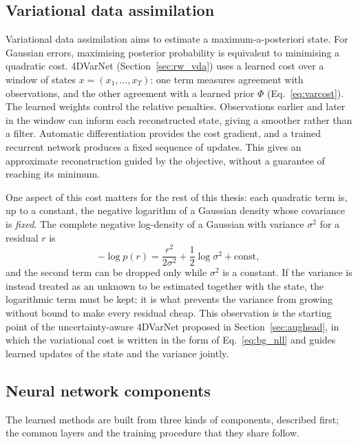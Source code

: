 \documentclass[english, 12pt, a4paper, elec, utf8, a-2b, online]{aaltothesis}
\begin{document}
\subsection{Variational data assimilation}
\label{sec:bg_var}

Variational data assimilation aims to estimate a maximum-a-posteriori
state. For Gaussian errors, maximising posterior probability is equivalent
to minimising a quadratic cost. 4DVarNet
(Section~\ref{sec:rw_vda}) uses a learned cost over a window of states
$x = (x_1, \dots, x_T)$: one term measures agreement with observations,
and the other agreement with a learned prior $\Phi$
(Eq.~\eqref{eq:varcost}). The learned weights control the relative penalties.
Observations earlier and later in the window can inform each reconstructed
state, giving a smoother rather than a filter. Automatic differentiation
provides the cost gradient, and a trained recurrent network produces a fixed
sequence of updates. This gives an approximate reconstruction guided by the
objective, without a guarantee of reaching its minimum.

One aspect of this cost matters for the rest of this thesis: each quadratic
term is, up to a constant, the negative logarithm of a Gaussian density whose
covariance is \emph{fixed}. The
complete negative log-density of a Gaussian with variance $\sigma^2$ for a
residual $r$ is
\begin{equation}
	-\log p(r) = \frac{r^2}{2\sigma^2} + \frac{1}{2}\log \sigma^2 + \mathrm{const},
	\label{eq:bg_nll}
\end{equation}
and the second term can be dropped only while $\sigma^2$ is a constant. If the
variance is instead treated as an unknown to be estimated together with the
state, the logarithmic term must be kept; it is what prevents the variance from
growing without bound to make every residual cheap. This observation is the
starting point of the uncertainty-aware 4DVarNet proposed in
Section~\ref{sec:aughead}, in which the variational cost is written in the form
of Eq.~\eqref{eq:bg_nll} and guides learned updates of the state and the variance jointly.

\subsection{Neural network components}
\label{sec:bg_nn}

The learned methods are built from three kinds of components, described first;
the common layers and the training procedure that they share follow.
\end{document}
